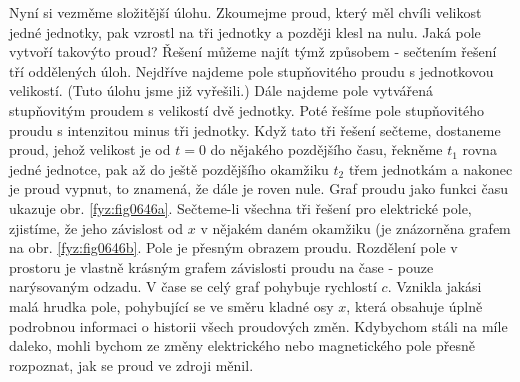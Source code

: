     Nyní si vezměme složitější úlohu. Zkoumejme proud, který měl chvíli velikost jedné jednotky, pak
    vzrostl na tři jednotky a později klesl na nulu. Jaká pole vytvoří takovýto proud? Řešení můžeme
    najít týmž způsobem - sečtením řešení tří oddělených úloh. Nejdříve najdeme pole stupňovitého
    proudu s jednotkovou velikostí. (Tuto úlohu jsme již vyřešili.) Dále najdeme pole vytvářená
    stupňovitým proudem s velikostí dvě jednotky. Poté řešíme pole stupňovitého proudu s intenzitou
    minus tři jednotky. Když tato tři řešení sečteme, dostaneme proud, jehož velikost je od \(t =
    0\) do nějakého pozdějšího času, řekněme \(t_1\) rovna jedné jednotce, pak až do ještě
    pozdějšího okamžiku \(t_2\) třem jednotkám a nakonec je proud vypnut, to znamená, že dále je
    roven nule. Graf proudu jako funkci času ukazuje obr. \ref{fyz:fig0646a}. Sečteme-li všechna tři
    řešení pro elektrické pole, zjistíme, že jeho závislost od \(x\) v nějakém daném okamžiku (je
    znázorněna grafem na obr. \ref{fyz:fig0646b}. Pole je přesným obrazem proudu. Rozdělení pole v
    prostoru je vlastně krásným grafem závislosti proudu na čase - pouze narýsovaným odzadu. V čase
    se celý graf pohybuje rychlostí \(c\). Vznikla jakási malá hrudka pole, pohybující se ve směru
    kladné osy \(x\), která obsahuje úplně podrobnou informaci o historii všech proudových změn.
    Kdybychom stáli na míle daleko, mohli bychom ze změny elektrického nebo magnetického pole přesně
    rozpoznat, jak se proud ve zdroji měnil.

